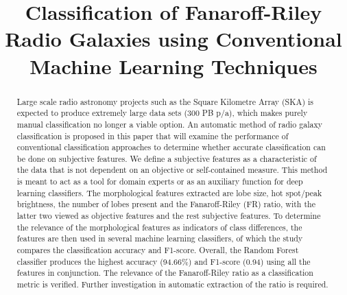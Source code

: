 \documentclass[conference]{IEEEtran}
\begin{document}
\title{Classification of Fanaroff-Riley Radio Galaxies using Conventional Machine Learning Techniques}

\author{
\and
{}
}

\maketitle

\begin{abstract}
Large scale radio astronomy projects such as the Square Kilometre Array (SKA) is expected to produce extremely large data sets (300 PB p/a), which makes purely manual classification no longer a viable option. An automatic method of radio galaxy classification is proposed in this paper that will examine the performance of conventional classification approaches to determine whether accurate classification can be done on subjective features. We define a subjective features as a characteristic of the data that is not dependent on an objective or self-contained measure.
This method is meant to act as a tool for domain experts or as an auxiliary function for deep learning classifiers. The morphological features extracted are lobe size, hot spot/peak brightness, the number of lobes present and the Fanaroff-Riley (FR) ratio, with the latter two viewed as objective features and the rest subjective features. To determine the relevance of the morphological features as indicators of class differences, the features are then used in several machine learning classifiers, of which the study compares the classification accuracy and F1-score. Overall, the Random Forest classifier produces the highest accuracy (94.66\%) and F1-score (0.94) using all the features in conjunction. The relevance of the Fanaroff-Riley ratio as a classification metric is verified. Further investigation in automatic extraction of the ratio is required.

\end{abstract}
\end{document}
